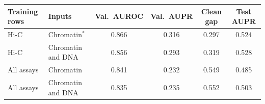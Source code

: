 \begin{tabular}{llcccc}
\toprule
Training rows & Inputs & Val.\ AUROC & Val.\ AUPR & Clean gap & Test AUPR \\
\midrule
Hi-C & Chromatin$^{\ast}$ & 0.866 & 0.316 & 0.297 & 0.524 \\
Hi-C & Chromatin and DNA & 0.856 & 0.293 & 0.319 & 0.528 \\
All assays & Chromatin & 0.841 & 0.232 & 0.549 & 0.485 \\
All assays & Chromatin and DNA & 0.835 & 0.235 & 0.552 & 0.503 \\
\bottomrule
\end{tabular}
